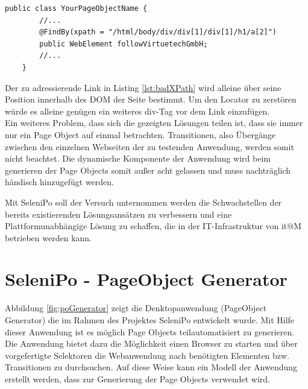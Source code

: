 \begin{lstlisting}[caption={Exportierte Testfälle},label={lst:badXPath}]
	public class YourPageObjectName {
		//...		
 		@FindBy(xpath = "/html/body/div/div[1]/div[1]/h1/a[2]")
		public WebElement followVirtuetechGmbH;	
		//...
	}
\end{lstlisting}

Der zu adressierende Link in  Listing \ref{lst:badXPath} wird alleine über seine Position innerhalb des DOM der Seite bestimmt.
Um den Locator zu zerstören würde es alleine genügen ein weiteres div-Tag vor dem Link einzufügen.
\\
Ein weiteres Problem, dass sich die gezeigten Lösungen teilen ist, dass sie immer nur ein Page Object auf einmal betrachten. Transitionen, also Übergänge zwischen den einzelnen Webseiten der zu testenden Anwendung, werden somit nicht beachtet. Die dynamische Komponente der Anwendung wird beim generieren der Page Objects somit außer acht gelassen und muss nachträglich händisch hinzugefügt werden.

Mit SeleniPo soll der Versuch unternommen werden die Schwachstellen der bereits existierenden Lösungsansätzen zu verbessern und eine Plattformunabhängige Lösung zu schaffen, die in der IT-Infrastruktur von it@M betrieben werden kann.

\newpage
\section{SeleniPo - PageObject Generator}
\label{sec:selenipo_pogenerator}

Abbildung \ref{fig:poGenerator} zeigt die Denktopanwendung (PageObject Generator) die im Rahmen des Projektes SeleniPo entwickelt wurde. Mit Hilfe dieser Anwendung ist es möglich Page Objects teilautomatisiert zu generieren. Die Anwendung bietet dazu die Möglichkeit einen Browser zu starten und über vorgefertigte Selektoren die Webanwendung nach benötigten Elementen bzw. Transitionen zu durchsuchen. Auf diese Weise kann ein Modell der Anwendung erstellt werden, dass zur Generierung der Page Objects verwendet wird.

